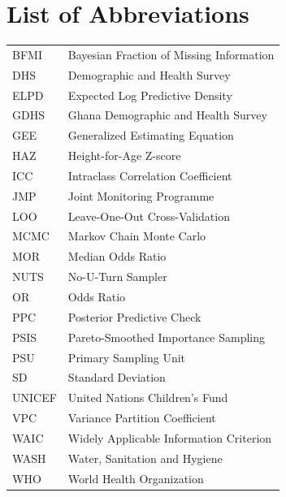 \chapter*{List of Abbreviations}
\begin{singlespace}
\begin{tabular}{ll}
BFMI & Bayesian Fraction of Missing Information \\
DHS & Demographic and Health Survey \\
ELPD & Expected Log Predictive Density \\
GDHS & Ghana Demographic and Health Survey \\
GEE & Generalized Estimating Equation \\
HAZ & Height-for-Age Z-score \\
ICC & Intraclass Correlation Coefficient \\
JMP & Joint Monitoring Programme \\
LOO & Leave-One-Out Cross-Validation \\
MCMC & Markov Chain Monte Carlo \\
MOR & Median Odds Ratio \\
NUTS & No-U-Turn Sampler \\
OR & Odds Ratio \\
PPC & Posterior Predictive Check \\
PSIS & Pareto-Smoothed Importance Sampling \\
PSU & Primary Sampling Unit \\
SD & Standard Deviation \\
UNICEF & United Nations Children's Fund \\
VPC & Variance Partition Coefficient \\
WAIC & Widely Applicable Information Criterion \\
WASH & Water, Sanitation and Hygiene \\
WHO & World Health Organization \\
\end{tabular}
\end{singlespace}
\clearpage
